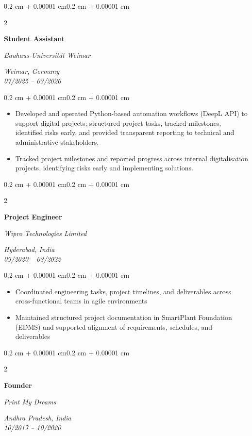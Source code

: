 \documentclass[10pt, a4paper]{article}
\newenvironment{highlights}{
    \begin{itemize}[
        topsep=0.08 cm,
        parsep=0.08 cm,
        partopsep=0pt,
        itemsep=0pt,
        leftmargin=0.4 cm + 10pt
    ]
}{
    \end{itemize}
}
\newenvironment{onecolentry}{
    \begin{adjustwidth}{0.2 cm + 0.00001 cm}{0.2 cm + 0.00001 cm}
}{
    \end{adjustwidth}
}
\newenvironment{twocolentry}[2][]{
    \onecolentry
    \def\secondColumn{#2}
    \setcolumnwidth{\fill, 4.5 cm}
    \begin{paracol}{2}
}{
    \switchcolumn \raggedleft \secondColumn
    \end{paracol}
    \endonecolentry
}
\begin{document}
\vspace{0.15cm}

\begin{twocolentry}{\textit{Weimar, Germany}\\\textit{07/2025 -- 03/2026}}
    \textbf{Student Assistant}

    \textit{Bauhaus-Universität Weimar}
\end{twocolentry}

\vspace{0.10 cm}
\begin{onecolentry}
    \begin{highlights}
        \item Developed and operated Python-based automation workflows (DeepL API) to support digital projects; structured project tasks, tracked milestones, identified risks early, and provided transparent reporting to technical and administrative stakeholders.
        \item Tracked project milestones and reported progress across internal 
digitalisation projects, identifying risks early and implementing 
solutions.
    \end{highlights}
\end{onecolentry}

\vspace{0.15cm}


\begin{twocolentry}{\textit{Hyderabad, India}\\\textit{09/2020 -- 03/2022}}
    \textbf{Project Engineer}

    \textit{Wipro Technologies Limited}
\end{twocolentry}

\vspace{0.10 cm}
\begin{onecolentry}
    \begin{highlights}
    \item Coordinated engineering tasks, project timelines, and deliverables across cross-functional teams in agile environments
    \item Maintained structured project documentation in SmartPlant Foundation (EDMS) and supported alignment of requirements, schedules, and deliverables
    \end{highlights}
\end{onecolentry}

\vspace{0.15cm}

\begin{twocolentry}{\textit{Andhra Pradesh, India}\\\textit{10/2017 -- 10/2020}}
    \textbf{Founder}

    \textit{Print My Dreams}
\end{twocolentry}
\end{document}
